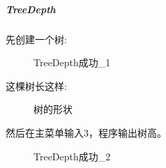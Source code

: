 \documentclass[supercite]{Experimental_Report}
\theoremstyle{definition}
\begin{document}
\clearpage
\subparagraph{TreeDepth}
\noindent
先创建一个树:
\begin{figure}[htbp]
	\centering
	\centering
	\caption{TreeDepth成功\_1}
	\label{fig5-8}
\end{figure}

这棵树长这样:
\begin{figure}[htbp]
	\centering
	\centering
	\caption{树的形状}
	\label{fig5-9}
\end{figure}

\clearpage
\noindent
然后在主菜单输入3，程序输出树高。
\begin{figure}[htbp]
	\centering
	\centering
	\caption{TreeDepth成功\_2}
	\label{fig5-10}
\end{figure}
\end{document}
